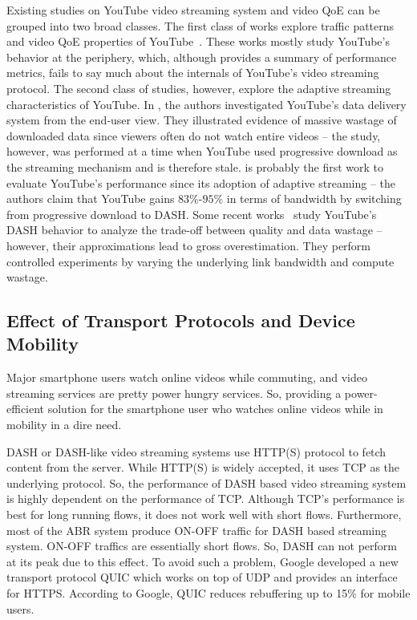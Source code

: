Existing studies on YouTube video streaming system and video QoE can be grouped into two broad classes. The first class of works explore traffic patterns and video QoE properties of YouTube~\cite{gill2007youtube,krishnappa2013dashing,wamser2016modeling,wamser2015poster,6757893ieeeexp,7129790ieeeexp}. These works mostly study YouTube's behavior at the periphery, which, although provides a summary of performance metrics, fails to say much about the internals of YouTube's video streaming protocol. The second class of studies, however, explore the adaptive streaming characteristics of YouTube. In \cite{finamore2011youtube}, the authors investigated YouTube's data delivery system from the end-user view. They illustrated evidence of massive wastage of downloaded data since viewers often do not watch entire videos -- the study, however, was performed at a time when YouTube used progressive download as the streaming mechanism and is therefore stale. \cite{krishnappa2013dashing} is probably the first work to evaluate YouTube's performance since its adoption of adaptive streaming -- the authors claim that YouTube gains $83\%$-$95\%$ in terms of bandwidth by switching from progressive download to DASH. Some recent works~\cite{sieber2015cost,seufert2015youtube,sieber2016sacrificing} study YouTube's DASH behavior to analyze the trade-off between quality and data wastage -- however, their approximations lead to gross overestimation. They perform controlled experiments by varying the underlying link bandwidth and compute wastage.


\subsection{Effect of Transport Protocols and Device Mobility}
Major smartphone users watch online videos while commuting, and video streaming services are pretty power hungry services. So, providing a power-efficient solution for the smartphone user who watches online videos while in mobility in a dire need.

DASH or DASH-like video streaming systems use HTTP(S) protocol to fetch content from the server. While HTTP(S) is widely accepted, it uses TCP as the underlying protocol. So, the performance of DASH based video streaming system is highly dependent on the performance of TCP. Although TCP's performance is best for long running flows, it does not work well with short flows. Furthermore, most of the ABR system produce ON-OFF traffic for DASH based streaming system. ON-OFF traffics are essentially short flows. So, DASH can not perform at its peak due to this effect. To avoid such a problem, Google developed a new transport protocol QUIC\cite{langley2017quic} which works on top of UDP and provides an interface for HTTPS. According to Google, QUIC reduces rebuffering up to 15\% for mobile users.

